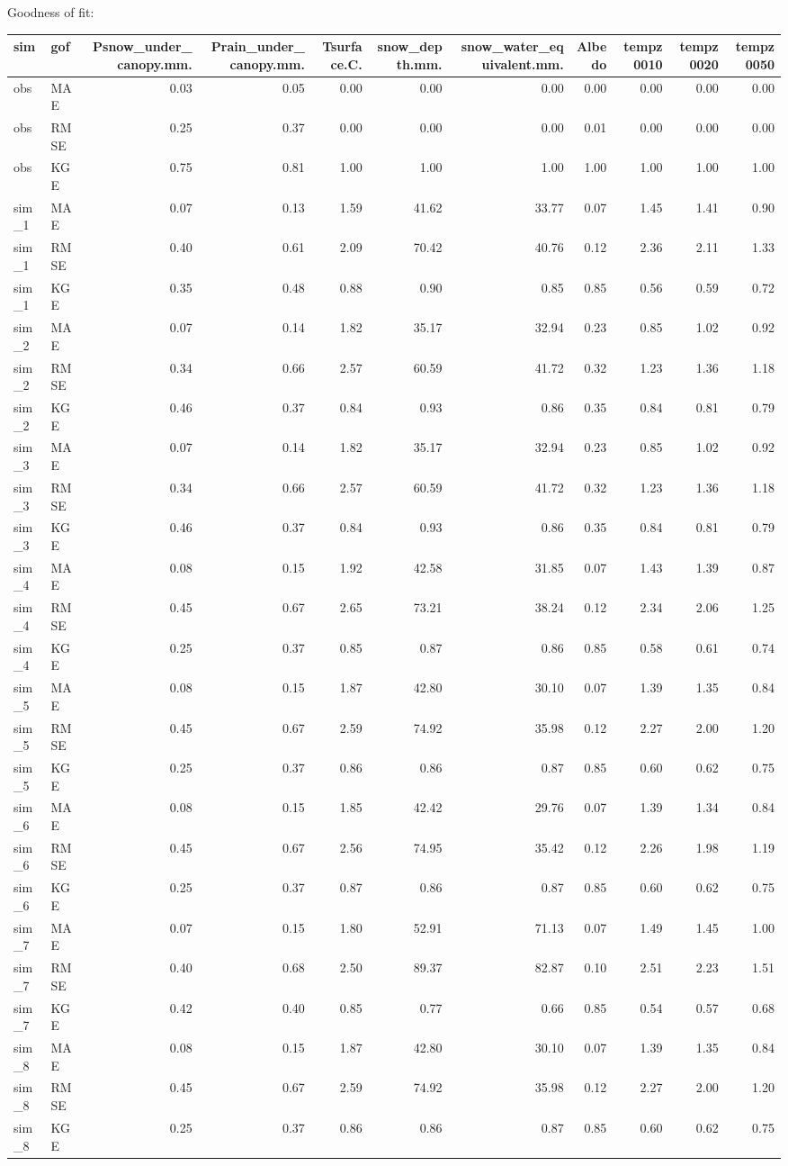 \documentclass[
]{article}
\begin{document}
Goodness of fit:

\begin{longtable}[]{@{}llrrrrrrrrr@{}}
\toprule
sim & gof & Psnow\_under\_canopy.mm. & Prain\_under\_canopy.mm. &
Tsurface.C. & snow\_depth.mm. & snow\_water\_equivalent.mm. & Albedo &
tempz0010 & tempz0020 & tempz0050\tabularnewline
\midrule
\endhead
obs & MAE & 0.03 & 0.05 & 0.00 & 0.00 & 0.00 & 0.00 & 0.00 & 0.00 &
0.00\tabularnewline
obs & RMSE & 0.25 & 0.37 & 0.00 & 0.00 & 0.00 & 0.01 & 0.00 & 0.00 &
0.00\tabularnewline
obs & KGE & 0.75 & 0.81 & 1.00 & 1.00 & 1.00 & 1.00 & 1.00 & 1.00 &
1.00\tabularnewline
sim\_1 & MAE & 0.07 & 0.13 & 1.59 & 41.62 & 33.77 & 0.07 & 1.45 & 1.41 &
0.90\tabularnewline
sim\_1 & RMSE & 0.40 & 0.61 & 2.09 & 70.42 & 40.76 & 0.12 & 2.36 & 2.11
& 1.33\tabularnewline
sim\_1 & KGE & 0.35 & 0.48 & 0.88 & 0.90 & 0.85 & 0.85 & 0.56 & 0.59 &
0.72\tabularnewline
sim\_2 & MAE & 0.07 & 0.14 & 1.82 & 35.17 & 32.94 & 0.23 & 0.85 & 1.02 &
0.92\tabularnewline
sim\_2 & RMSE & 0.34 & 0.66 & 2.57 & 60.59 & 41.72 & 0.32 & 1.23 & 1.36
& 1.18\tabularnewline
sim\_2 & KGE & 0.46 & 0.37 & 0.84 & 0.93 & 0.86 & 0.35 & 0.84 & 0.81 &
0.79\tabularnewline
sim\_3 & MAE & 0.07 & 0.14 & 1.82 & 35.17 & 32.94 & 0.23 & 0.85 & 1.02 &
0.92\tabularnewline
sim\_3 & RMSE & 0.34 & 0.66 & 2.57 & 60.59 & 41.72 & 0.32 & 1.23 & 1.36
& 1.18\tabularnewline
sim\_3 & KGE & 0.46 & 0.37 & 0.84 & 0.93 & 0.86 & 0.35 & 0.84 & 0.81 &
0.79\tabularnewline
sim\_4 & MAE & 0.08 & 0.15 & 1.92 & 42.58 & 31.85 & 0.07 & 1.43 & 1.39 &
0.87\tabularnewline
sim\_4 & RMSE & 0.45 & 0.67 & 2.65 & 73.21 & 38.24 & 0.12 & 2.34 & 2.06
& 1.25\tabularnewline
sim\_4 & KGE & 0.25 & 0.37 & 0.85 & 0.87 & 0.86 & 0.85 & 0.58 & 0.61 &
0.74\tabularnewline
sim\_5 & MAE & 0.08 & 0.15 & 1.87 & 42.80 & 30.10 & 0.07 & 1.39 & 1.35 &
0.84\tabularnewline
sim\_5 & RMSE & 0.45 & 0.67 & 2.59 & 74.92 & 35.98 & 0.12 & 2.27 & 2.00
& 1.20\tabularnewline
sim\_5 & KGE & 0.25 & 0.37 & 0.86 & 0.86 & 0.87 & 0.85 & 0.60 & 0.62 &
0.75\tabularnewline
sim\_6 & MAE & 0.08 & 0.15 & 1.85 & 42.42 & 29.76 & 0.07 & 1.39 & 1.34 &
0.84\tabularnewline
sim\_6 & RMSE & 0.45 & 0.67 & 2.56 & 74.95 & 35.42 & 0.12 & 2.26 & 1.98
& 1.19\tabularnewline
sim\_6 & KGE & 0.25 & 0.37 & 0.87 & 0.86 & 0.87 & 0.85 & 0.60 & 0.62 &
0.75\tabularnewline
sim\_7 & MAE & 0.07 & 0.15 & 1.80 & 52.91 & 71.13 & 0.07 & 1.49 & 1.45 &
1.00\tabularnewline
sim\_7 & RMSE & 0.40 & 0.68 & 2.50 & 89.37 & 82.87 & 0.10 & 2.51 & 2.23
& 1.51\tabularnewline
sim\_7 & KGE & 0.42 & 0.40 & 0.85 & 0.77 & 0.66 & 0.85 & 0.54 & 0.57 &
0.68\tabularnewline
sim\_8 & MAE & 0.08 & 0.15 & 1.87 & 42.80 & 30.10 & 0.07 & 1.39 & 1.35 &
0.84\tabularnewline
sim\_8 & RMSE & 0.45 & 0.67 & 2.59 & 74.92 & 35.98 & 0.12 & 2.27 & 2.00
& 1.20\tabularnewline
sim\_8 & KGE & 0.25 & 0.37 & 0.86 & 0.86 & 0.87 & 0.85 & 0.60 & 0.62 &
0.75\tabularnewline
\bottomrule
\end{longtable}
\end{document}
